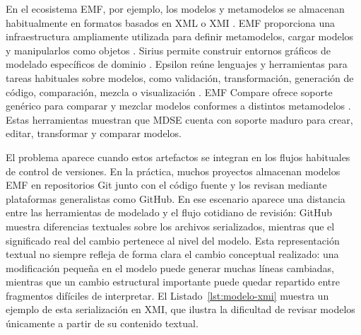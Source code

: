 \documentclass[11pt]{article}
\begin{document}
En el ecosistema EMF, por ejemplo, los modelos y metamodelos se almacenan habitualmente en formatos basados en XML o XMI \cite{XMI}. EMF proporciona una infraestructura ampliamente utilizada para definir metamodelos, cargar modelos y manipularlos como objetos \cite{emf-book,emf-docs}. Sirius permite construir entornos gráficos de modelado específicos de dominio \cite{sirius-docs}. Epsilon reúne lenguajes y herramientas para tareas habituales sobre modelos, como validación, transformación, generación de código, comparación, mezcla o visualización \cite{epsilon-docs}. EMF Compare ofrece soporte genérico para comparar y mezclar modelos conformes a distintos metamodelos \cite{emfcompare-overview}. Estas herramientas muestran que MDSE cuenta con soporte maduro para crear, editar, transformar y comparar modelos.

El problema aparece cuando estos artefactos se integran en los flujos habituales de control de versiones. En la práctica, muchos proyectos almacenan modelos EMF en repositorios Git junto con el código fuente y los revisan mediante plataformas generalistas como GitHub. En ese escenario aparece una distancia entre las herramientas de modelado y el flujo cotidiano de revisión: GitHub muestra diferencias textuales sobre los archivos serializados, mientras que el significado real del cambio pertenece al nivel del modelo. Esta representación textual no siempre refleja de forma clara el cambio conceptual realizado: una modificación pequeña en el modelo puede generar muchas líneas cambiadas, mientras que un cambio estructural importante puede quedar repartido entre fragmentos difíciles de interpretar. El Listado~\ref{lst:modelo-xmi} muestra un ejemplo de esta serialización en XMI, que ilustra la dificultad de revisar modelos únicamente a partir de su contenido textual.
\end{document}
